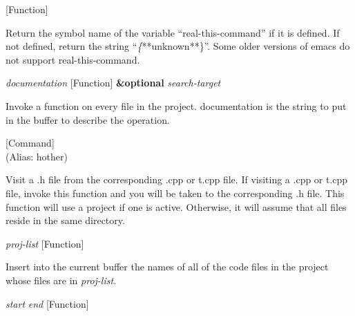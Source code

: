 \vspace{1em}
\noindent
{}
\usebox{\funcname}
 \hfill [Function]

\begin{doc-string}
Return the symbol name of the variable ``real-this-command'' if it is defined.
If not defined, return the string ``\emph\{**unknown**\}''.  Some older versions of emacs
do not support real-this-command.
\end{doc-string}

\vspace{1em}
\noindent
{}
\usebox{\funcname}\emph{documentation}
 \hfill [Function]
\hspace*{\wd\funcname}\textbf{\&optional} \emph{search-target}
\hspace*{\wd\funcname}

\begin{doc-string}
Invoke a function on every file in the project.
documentation is the string to put in the buffer to describe the operation.
\end{doc-string}

\vspace{1em}
\noindent
{}
\usebox{\funcname}
 \hfill [Command]\\%
 (Alias: hother)

\begin{doc-string}
Visit a .h file from the corresponding .cpp or t.cpp file.  If visiting a
.cpp or t.cpp file, invoke this function and you will be taken to the
corresponding .h file.  This function will use a project if one is active.
Otherwise, it will assume that all files reside in the same directory.
\end{doc-string}

\vspace{1em}
\noindent
{}
\usebox{\funcname}\emph{proj-list}
 \hfill [Function]

\begin{doc-string}
Insert into the current buffer the names of all of the code files in the
project whose files are in \emph{proj-list}.
\end{doc-string}

\vspace{1em}
\noindent
{}
\usebox{\funcname}\emph{start} \emph{end}
 \hfill [Function]

